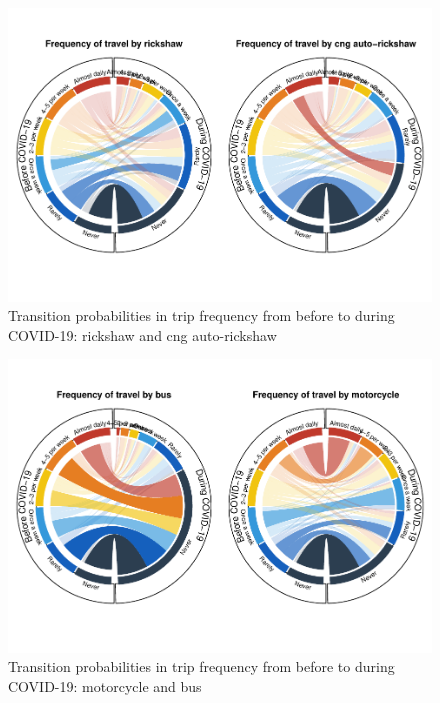 \documentclass[]{elsarticle} %
\begin{document}
\begin{figure}
\centering
\includegraphics{Frequency-of-Travel-by-Mode-COVID-19-Bangladesh_files/figure-latex/circular-plots-transition-probabilities-2-1.pdf}
\caption{\label{fig:circular-plot-2}Transition probabilities in trip
frequency from before to during COVID-19: rickshaw and cng
auto-rickshaw}
\end{figure}

\begin{figure}
\centering
\includegraphics{Frequency-of-Travel-by-Mode-COVID-19-Bangladesh_files/figure-latex/circular-plots-transition-probabilities-3-1.pdf}
\caption{\label{fig:circular-plot-3}Transition probabilities in trip
frequency from before to during COVID-19: motorcycle and bus}
\end{figure}
\end{document}
